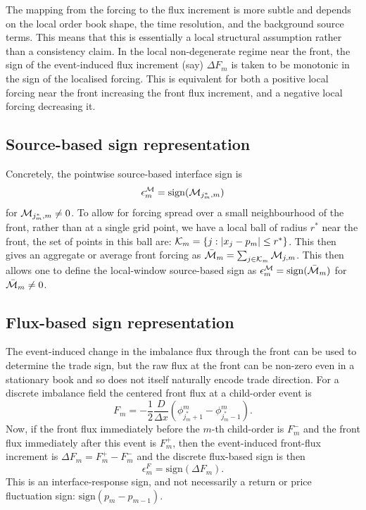 \documentclass[5p,final]{elsarticle}
\newcommand{\sign}{\mathrm{sign}}
\begin{document}
The mapping from the forcing to the flux increment is more subtle and depends on the local order book shape, the time resolution, and the background source terms. This means that this is essentially a local structural assumption rather than a consistency claim. In the local non-degenerate regime near the front, the sign of the event-induced flux increment (say) $\Delta F_m$ is taken to be monotonic in the sign of the localised forcing. This is equivalent for both a positive local forcing near the front increasing the front flux increment, and a negative local forcing decreasing it. 

\subsection{Source-based sign representation}

Concretely, the pointwise source-based interface sign is
\begin{equation}
    \epsilon^{\cal M}_m= \sign({\cal M}_{j^*_m,m})
\end{equation}
for ${\cal M}_{j^*_m,m}\neq 0$. To allow for forcing spread over a small neighbourhood of the front, rather than at a single grid point, we have a local ball of radius $r^*$ near the front, the set of points in this ball are: ${\cal K}_m = \{ j: |x_j - p_m | \le r^* \}$. This then gives an aggregate or average front forcing as $ \bar {\cal M}_{m} = \sum_{j \in {{\cal K}_m}}{\cal M}_{j,m}$. This then allows one to define the local-window source-based sign as $\epsilon_m^{\cal M}= 
\sign (\bar {\cal M}_{m})$ for $\bar {\cal M}_{m} \neq 0$.

\subsection{Flux-based sign representation}

The event-induced change in the imbalance flux through the front can be used to determine the trade sign, but the raw flux at the front can be non-zero even in a stationary book and so does not itself naturally encode trade direction. For a discrete imbalance field the centered front flux at a child-order event is
\begin{equation}
    F_m = - \frac{1}{2} \frac{D}{\Delta x} \left( {\phi^m_{j^*_m+1}-\phi^m_{j^*_m-1}} \right).
\end{equation}
Now, if the front flux immediately before the $m$-th child-order is $F_m^-$ and the front flux immediately after this event is $F_m^+$, then the event-induced front-flux increment is $\Delta F_m = F_m^+ -F_m^-$ and the discrete flux-based sign is then 
\begin{equation}
    \epsilon_m^F =\sign(\Delta F_m).
\end{equation}
This is an interface-response sign, and not necessarily a return or price fluctuation sign: $\sign (p_m - p_{m-1})$.
\end{document}
